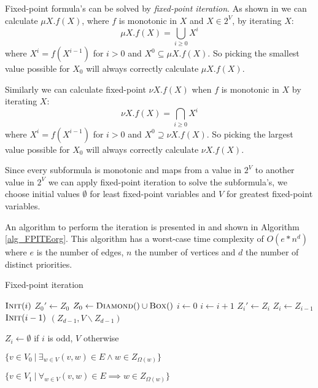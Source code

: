 Fixed-point formula's can be solved by \textit{fixed-point iteration}. As shown in \cite{Emerson:1986:MCP:900378} we can calculate $\mu X.f(X)$, where $f$ is monotonic in $X$ and $X \in 2^V$, by iterating $X$:
\[ \mu X.f(X) = \bigcup_{i \geq 0} X^i \]
where $X^i = f(X^{i-1})$ for $i > 0$ and $X^0 \subseteq \mu X.f(X)$. So picking the smallest value possible for $X_0$ will always correctly calculate $\mu X. f(X)$.

Similarly we can calculate fixed-point $\nu X.f(X)$ when $f$ is monotonic in $X$ by iterating $X$:
\[ \nu X.f(X) = \bigcap_{i \geq 0} X^i \]
where $X^i = f(X^{i-1})$ for $i > 0$ and $X^0 \supseteq \nu X.f(X)$. So picking the largest value possible for $X_0$ will always correctly calculate $\nu X. f(X)$.

Since every subformula is monotonic and maps from a value in $2^V$ to another value in $2^V$ we can apply fixed-point iteration to solve the subformula's, we choose initial values $\emptyset$ for least fixed-point variables and $V$ for greatest fixed-point variables.

An algorithm to perform the iteration is presented in \cite{FPITE} and shown in Algorithm \ref{alg_FPITEorg}. This algorithm has a worst-case time complexity of $O(e * n ^d)$ where $e$ is the number of edges, $n$ the number of vertices and $d$ the number of distinct priorities.
\begin{algorithm}
	\caption{Fixed-point iteration}
	\label{alg_FPITEorg}
	\begin{multicols}{2}
		\begin{algorithmic}[1]
			\State $\textsc{Init}(i)$
			\EndFor
			\Repeat
			\State $Z_0'\gets Z_0$
			\State $Z_0 \gets \textsc{Diamond}() \cup \textsc{Box}()$
			\State $i \gets 0$
			\State $i \gets i+1$
			\State $Z_i' \gets Z_i$
			\State $Z_i \gets Z_{i-1}$
			\State $\textsc{Init}(i-1)$
			\EndWhile
			\State \Return $(Z_{d-1},V\backslash Z_{d-1})$
			\EndFunction
		\end{algorithmic}\bigskip\bigskip
		\begin{algorithmic}[1]
			\Function{Init}{$i$}
			\State $Z_i \gets \emptyset$ if $i$ is odd, $V$ otherwise
			\EndFunction
		\end{algorithmic}\bigskip
		\begin{algorithmic}[1]
			\Function{Diamond}{}
			\State \Return $\{ v \in V_0\ |\ \exists_{w\in V} (v,w) \in E \wedge w \in Z_{\Omega(w)}\}$
			\EndFunction
		\end{algorithmic}\bigskip
		\begin{algorithmic}[1]
			\Function{Box}{}
			\State \Return $\{ v \in V_1\ |\ \forall_{w\in V} (v,w) \in E \implies w \in Z_{\Omega(w)}\}$
			\EndFunction
		\end{algorithmic}
	\end{multicols}
\end{algorithm}

